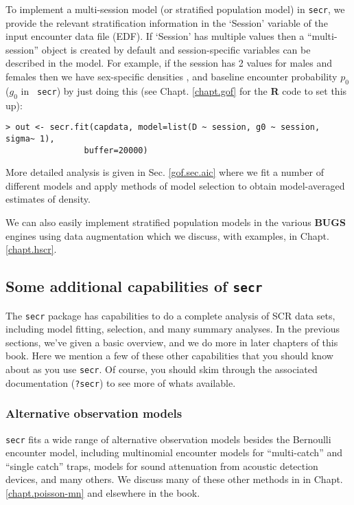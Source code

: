 To implement a multi-session model (or stratified population model) in
\mbox{\tt secr},
we provide the relevant stratification information in the 
 `Session' variable of the input encounter data file (EDF). If
 `Session' has multiple values then a
``multi-session'' object is created by default and session-specific variables can
be described in the model. For example, if the session has 2 values
for males and females then we have sex-specific densities , and
baseline encounter probability $p_{0}$ ($g_{0}$  in \mbox{\tt
  secr}) by just doing this (see Chapt. \ref{chapt.gof} for the {\bf
  R} code to set this up):
\begin{verbatim}
> out <- secr.fit(capdata, model=list(D ~ session, g0 ~ session, sigma~ 1),
                buffer=20000)
\end{verbatim}
More detailed analysis is given in Sec. \ref{gof.sec.aic} where we fit
a number of different models and apply methods of model selection to
obtain model-averaged estimates of density.

We can also easily implement stratified population models in the
various {\bf BUGS} engines using data augmentation
\citep{converse_royle:2012,royle_converse:2013} which we discuss, with
examples,  in Chapt. \ref{chapt.hscr}.


\subsection{Some additional capabilities of \mbox{\tt secr}}

The \mbox{\tt secr} package has capabilities to do a complete analysis
of SCR data sets, including model fitting, selection, and many summary
analyses. In the previous sections, we've given a basic overview, and
we do more in later chapters of this book.  Here we mention a few of
these other capabilities that you should know about as you use
\mbox{\tt secr}. Of course, you should skim through the
associated documentation (\mbox{\tt ?secr}) to see more of whats available.

\subsubsection{Alternative observation models}
\mbox{\tt secr} fits a wide range of alternative observation models
besides the Bernoulli encounter model, including multinomial encounter
models for ``multi-catch'' and ``single catch'' traps, models for
sound attenuation from acoustic detection devices, and many others. We
discuss many of these other methods in in
Chapt. \ref{chapt.poisson-mn} and elsewhere in the book.

